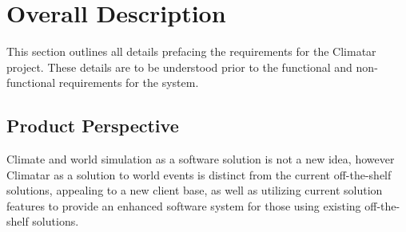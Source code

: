 \documentclass[]{article}
\begin{document}


\section{Overall Description}
\label{sec:overall_description}

This section outlines all details prefacing the requirements for the Climatar project. These details are to be understood prior to the functional and non-functional requirements for the system.

\subsection{Product Perspective}
\label{sub:product_perspective}

Climate and world simulation as a software solution is not a new idea, however Climatar as a solution to world events is distinct from the current off-the-shelf solutions, appealing to a new client base, as well as utilizing current solution features to provide an enhanced software system for those using existing off-the-shelf solutions.
\end{document}
